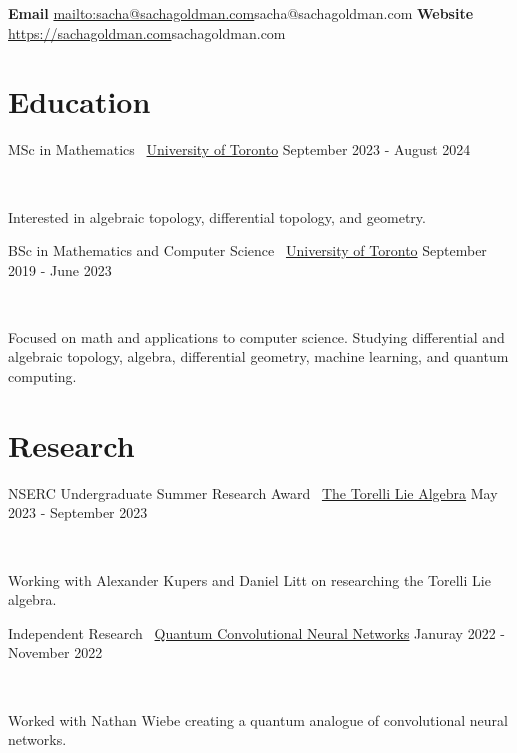 \documentclass[]{style}
\begin{document}

\vspace{-5mm}
\begin{center}
	\textbf{Email}
	\url{mailto:sacha@sachagoldman.com}{sacha@sachagoldman.com} \hspace{1cm}
	\textbf{Website} 
	\url{https://sachagoldman.com}{sachagoldman.com}
\end{center}
\vspace{5mm}
 
\section{Education}

\begin{entrylist}

\vspace{1mm}

\entry
{MSc in Mathematics \ {\normalfont \underline{University of Toronto}}}
{September 2023 - August 2024}
{  ~ \vspace{-2.5mm}

Interested in algebraic topology, differential topology, and geometry. 
}

\entry
{BSc in Mathematics and Computer Science \ {\normalfont \underline{University of Toronto}}}
{September 2019 - June 2023}
{ ~ \vspace{-2.5mm}

Focused on math and applications to computer science. Studying differential  and algebraic topology, algebra, differential geometry, machine learning, and quantum computing.
}

\end{entrylist}

\section{Research}

\begin{entrylist}

\vspace{1mm}

\entry
{NSERC Undergraduate Summer Research Award \ {\normalfont \underline{The Torelli Lie Algebra}}}
{May 2023 - September 2023}
{ ~ \vspace{-2.5mm}

Working with Alexander Kupers and Daniel Litt on researching the Torelli Lie algebra.}

\entry
{Independent Research \ {\normalfont \underline{Quantum Convolutional Neural Networks}}}
{Januray 2022 - November 2022}
{ ~ \vspace{-2.5mm}

Worked with Nathan Wiebe creating a quantum analogue of convolutional neural networks.}

\end{entrylist}
\end{document}
